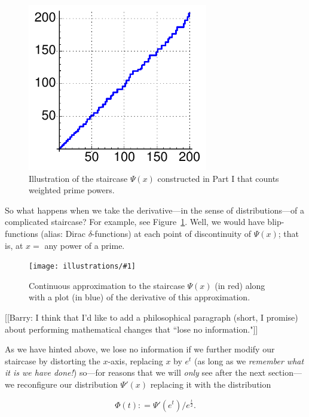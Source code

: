 \documentclass[11pt]{article}
\newcommand{\ill}[3]{ 
   \begin{figure}[htbp]
   \begin{center}
   \texttt{[image: illustrations/\#1]}
   \caption{#3}
   \end{center}
    \end{figure}
}
\theoremstyle{plain}
\theoremstyle{definition}
\numberwithin{equation}{section}
\numberwithin{figure}{section}
\numberwithin{table}{section}
\begin{document}
\begin{figure}[htbp]
\begin{center}
\includegraphics[width=0.7\textwidth]{illustrations/psi_200}
\caption{Illustration of the  staircase $\Psi(x)$  constructed in Part I that 
counts weighted prime powers.\label{fig:psi_200}}
\end{center}
\end{figure}
  
So what happens when we take the derivative---in the sense of
distributions---of a complicated staircase?  For example, see
Figure~\ref{fig:psi_200}.  Well, we would have blip-functions (alias:
Dirac $\delta$-functions) at each point of discontinuity of $\Psi(x)$;
that is, at $x=$ any power of a prime.
  
     \bigskip
   
     \ill{psi_prime}{.7}{Continuous approximation to the staircase
       $\Psi(x)$ (in red) along with a plot (in blue) of the
       derivative of this approximation.}
      
\bigskip

[[Barry: I think that I'd like to add a philosophical paragraph
(short, I promise) about performing mathematical changes that ``lose
no information."]]
  
As we have hinted above, we lose no information if we further modify
our staircase by distorting the $x$-axis, replacing $x$ by $e^t$ (as
long as we {\em remember what it is we have done!})  so---for reasons
that we will {\em only} see after the next section---we reconfigure
our distribution $\Psi'(x)$ replacing it with the distribution

$$
  \Phi(t) : = \Psi'(e^t)/e^{\frac{t}{2}}.
$$
\end{document}
